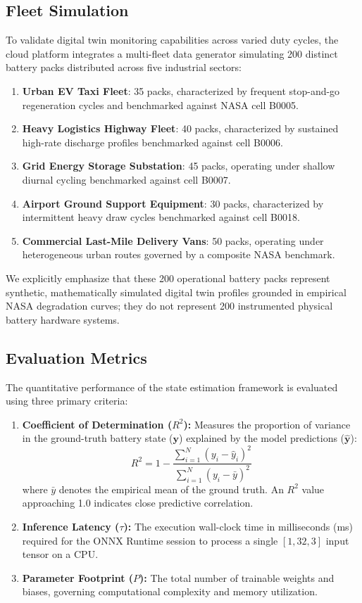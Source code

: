 \documentclass[conference]{IEEEtran}
\begin{document}
\subsection{Fleet Simulation}
To validate digital twin monitoring capabilities across varied duty cycles, the cloud platform integrates a multi-fleet data generator simulating 200 distinct battery packs distributed across five industrial sectors:
\begin{enumerate}
    \item \textbf{Urban EV Taxi Fleet}: 35 packs, characterized by frequent stop-and-go regeneration cycles and benchmarked against NASA cell B0005.
    \item \textbf{Heavy Logistics Highway Fleet}: 40 packs, characterized by sustained high-rate discharge profiles benchmarked against cell B0006.
    \item \textbf{Grid Energy Storage Substation}: 45 packs, operating under shallow diurnal cycling benchmarked against cell B0007.
    \item \textbf{Airport Ground Support Equipment}: 30 packs, characterized by intermittent heavy draw cycles benchmarked against cell B0018.
    \item \textbf{Commercial Last-Mile Delivery Vans}: 50 packs, operating under heterogeneous urban routes governed by a composite NASA benchmark.
\end{enumerate}
We explicitly emphasize that these 200 operational battery packs represent synthetic, mathematically simulated digital twin profiles grounded in empirical NASA degradation curves; they do not represent 200 instrumented physical battery hardware systems.

\subsection{Evaluation Metrics}
The quantitative performance of the state estimation framework is evaluated using three primary criteria:
\begin{enumerate}
    \item \textbf{Coefficient of Determination ($R^2$):} Measures the proportion of variance in the ground-truth battery state ($\mathbf{y}$) explained by the model predictions ($\hat{\mathbf{y}}$):
    \begin{equation}
    R^2 = 1 - \frac{\sum_{i=1}^{N} (y_i - \hat{y}_i)^2}{\sum_{i=1}^{N} (y_i - \bar{y})^2}
    \end{equation}
    where $\bar{y}$ denotes the empirical mean of the ground truth. An $R^2$ value approaching 1.0 indicates close predictive correlation.
    \item \textbf{Inference Latency ($\tau$):} The execution wall-clock time in milliseconds (ms) required for the ONNX Runtime session to process a single $[1, 32, 3]$ input tensor on a CPU.
    \item \textbf{Parameter Footprint ($P$):} The total number of trainable weights and biases, governing computational complexity and memory utilization.
\end{enumerate}
\end{document}
